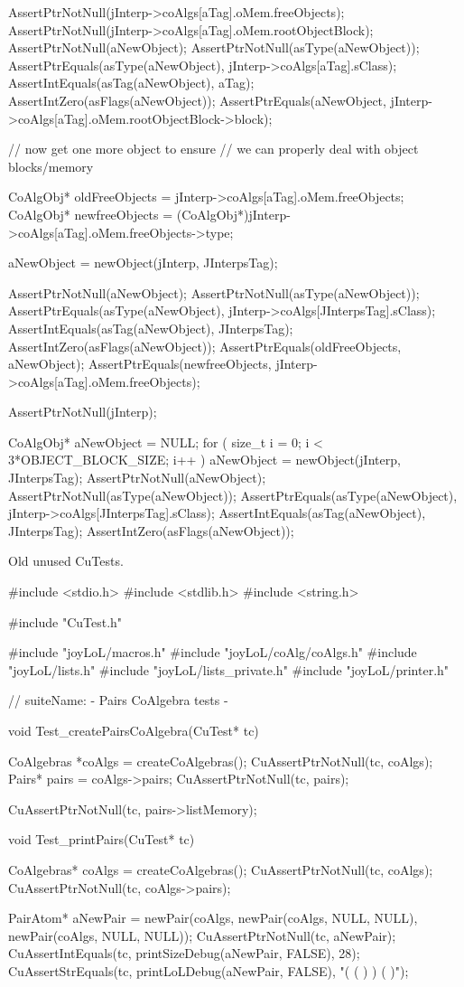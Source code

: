   AssertPtrNotNull(jInterp->coAlgs[aTag].oMem.freeObjects);
  AssertPtrNotNull(jInterp->coAlgs[aTag].oMem.rootObjectBlock);
  AssertPtrNotNull(aNewObject);
  AssertPtrNotNull(asType(aNewObject));
  AssertPtrEquals(asType(aNewObject), jInterp->coAlgs[aTag].sClass);
  AssertIntEquals(asTag(aNewObject), aTag);
  AssertIntZero(asFlags(aNewObject));
  AssertPtrEquals(aNewObject,
    jInterp->coAlgs[aTag].oMem.rootObjectBlock->block);

  // now get one more object to ensure
  // we can properly deal with object blocks/memory
  
  CoAlgObj* oldFreeObjects =
    jInterp->coAlgs[aTag].oMem.freeObjects;
  CoAlgObj* newfreeObjects = 
    (CoAlgObj*)jInterp->coAlgs[aTag].oMem.freeObjects->type;

  aNewObject = newObject(jInterp, JInterpsTag);

  AssertPtrNotNull(aNewObject);
  AssertPtrNotNull(asType(aNewObject));
  AssertPtrEquals(asType(aNewObject), jInterp->coAlgs[JInterpsTag].sClass);
  AssertIntEquals(asTag(aNewObject), JInterpsTag);
  AssertIntZero(asFlags(aNewObject));
  AssertPtrEquals(oldFreeObjects, aNewObject);
  AssertPtrEquals(newfreeObjects, jInterp->coAlgs[aTag].oMem.freeObjects);
\stopCTest
\stopTestCase


\startCTest
  AssertPtrNotNull(jInterp);

  CoAlgObj* aNewObject = NULL;
  for ( size_t i = 0; i < 3*OBJECT_BLOCK_SIZE; i++ ) {
    aNewObject = newObject(jInterp, JInterpsTag);
  }
  AssertPtrNotNull(aNewObject);
  AssertPtrNotNull(asType(aNewObject));
  AssertPtrEquals(asType(aNewObject), jInterp->coAlgs[JInterpsTag].sClass);
  AssertIntEquals(asTag(aNewObject), JInterpsTag);
  AssertIntZero(asFlags(aNewObject));
\stopCTest
\stopTestCase
\stopTestSuite

Old unused CuTests.

\starttyping
#include <stdio.h>
#include <stdlib.h>
#include <string.h>

#include "CuTest.h"

#include "joyLoL/macros.h"
#include "joyLoL/coAlg/coAlgs.h"
#include "joyLoL/lists.h"
#include "joyLoL/lists_private.h"
#include "joyLoL/printer.h"

// suiteName: - Pairs CoAlgebra tests -

void Test_createPairsCoAlgebra(CuTest* tc) {
  CoAlgebras *coAlgs = createCoAlgebras();
  CuAssertPtrNotNull(tc, coAlgs);
  Pairs* pairs = coAlgs->pairs;
  CuAssertPtrNotNull(tc, pairs);

  CuAssertPtrNotNull(tc, pairs->listMemory);
}

void Test_printPairs(CuTest* tc) {
  CoAlgebras* coAlgs = createCoAlgebras();
  CuAssertPtrNotNull(tc, coAlgs);
  CuAssertPtrNotNull(tc, coAlgs->pairs);

  PairAtom* aNewPair = newPair(coAlgs,
                               newPair(coAlgs, NULL, NULL),
                               newPair(coAlgs, NULL, NULL));
  CuAssertPtrNotNull(tc, aNewPair);
  CuAssertIntEquals(tc, printSizeDebug(aNewPair, FALSE), 28);
  CuAssertStrEquals(tc, printLoLDebug(aNewPair, FALSE), "( ( ) ) ( )");
}
\stoptyping
